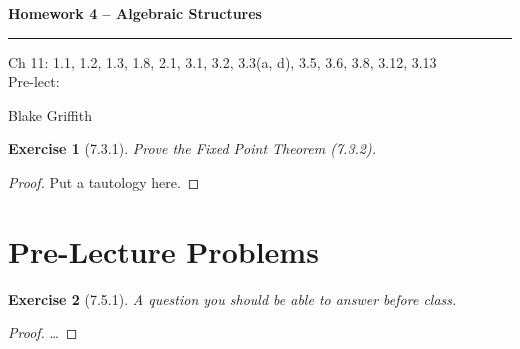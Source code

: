 \documentclass[12pt]{article}
\newtheorem*{exer}{Exercise}
\begin{document}
\textbf{Homework 4 -- Algebraic Structures} \\

\hrule

\begin{minipage}{.80\linewidth}
    \flushleft
    Ch 11: 1.1, 1.2, 1.3, 1.8, 2.1, 3.1, 3.2, 3.3(a, d), 3.5, 3.6, 3.8,
    3.12, 3.13 \\
    Pre-lect:  \\
\end{minipage}
\begin{minipage}{.20\linewidth}
    \flushright
    Blake Griffith
\end{minipage}


\begin{exer}[7.3.1]

    Prove the Fixed Point Theorem (7.3.2).

\end{exer}

\begin{proof}

    Put a tautology here.

\end{proof}

\section*{Pre-Lecture Problems}

\begin{exer}[7.5.1]

    A question you should be able to answer before class.

\end{exer}

\begin{proof}

    \dots

\end{proof}

\end{document}
